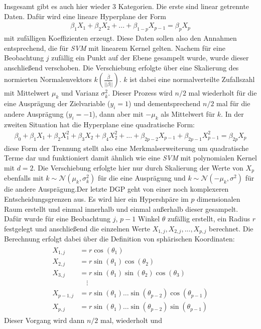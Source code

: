 \documentclass[
]{article}
\begin{document}
Insgesamt gibt es auch hier wieder 3 Kategorien. Die erste sind linear
getrennte Daten. Dafür wird eine lineare Hyperplane der Form
\begin{align}
\beta_1 X_1+\beta_2 X_2 +...+\beta_{1-p} X_{p-1}= \beta_p X_p
\end{align} mit zufälligen Koeffizienten erzeugt. Diese Daten sollen
also den Annahmen entsprechend, die für \textit{SVM} mit linearem Kernel
gelten. Nachem für eine Beobachtung \(j\) zufällig ein Punkt auf der
Ebene gesampelt wurde, wurde dieser anschließend verschoben. Die
Verschiebung erfolgte über eine Skalierung des normierten
Normalenvektors
\(k\left(\frac{\overline{\beta}}{||\overline{\beta}||}\right)\). \(k\)
ist dabei eine normalverteilte Zufallszahl mit Mittelwert \(\mu_k\) und
Varianz \(\sigma^2_k\). Dieser Prozess wird \(n/2\) mal wiederholt für
die eine Ausprägung der Zielvariable (\(y_i=1\)) und dementsprechend
\(n/2\) mal für die andere Ausprägung (\(y_i=-1\)), dann aber mit
\(-\mu_k\) als Mittelwert für \(k\). \newline In der zweiten Situation
hat die Hyperplane eine quadratische Form: \begin{align}
\beta_0+\beta_1 X_1 + \beta_2 X_1^2+\beta_3 X_2+\beta_4 X_2^2+...+\beta_{2p-2}X_{p-1}+\beta_{2p-1}X_{p-1}^2=\beta_{2p} X_p
\end{align} diese Form der Trennung stellt also eine Merkmalserweiterung
um quadratische Terme dar und funktioniert damit ähnlich wie eine
\textit{SVM} mit polynomialen Kernel mit \(d=2\). Die Verschiebung
erfolgte hier nur durch Skalierung der Werte von \(X_p\) ebenfalls mit
\(k\sim\mathcal{N}(\mu_k,\sigma^2_k)\) für die eine Ausprägung und
\(k\sim\mathcal{N}(-\mu_k,\sigma^2)\) für die andere
Ausprägung.\newline  Der letzte DGP geht von einer noch komplexeren
Entscheidungsgrenzen aus. Es wird hier ein Hypershpäre im \(p\)
dimensionalen Raum erstellt und einmal innerhalb und einmal außerhalb
dieser gesampelt. Dafür wurde für eine Beobachtung \(j\), \(p-1\) Winkel
\(\theta\) zufällig erstellt, ein Radius \(r\) festgelegt und
anschließend die einzelnen Werte \(X_{1,j},X_{2,j},...,X_{p,j}\)
berechnet. Die Berechnung erfolgt dabei über die Definition von
sphärischen Koordinaten: \begin{align}
\begin{aligned}
        X_{1,j} &= r \cos(\theta_1)\\
        X_{2,j} &= r \sin(\theta_1)\cos(\theta_2)\\
        X_{3,j} &= r \sin(\theta_1)\sin(\theta_2)\cos(\theta_3)\\
        &\quad \vdots\\
        X_{p-1,j}&=r \sin(\theta_1)\ldots \sin(\theta_{p-2})\cos(\theta_{p-1})\\
        X_{p,j}&=r \sin(\theta_1)\ldots \sin(\theta_{p-2})\sin(\theta_{p-1})
    \end{aligned}
    \end{align} Dieser Vorgang wird dann \(n/2\) mal, wiederholt und
\end{document}
